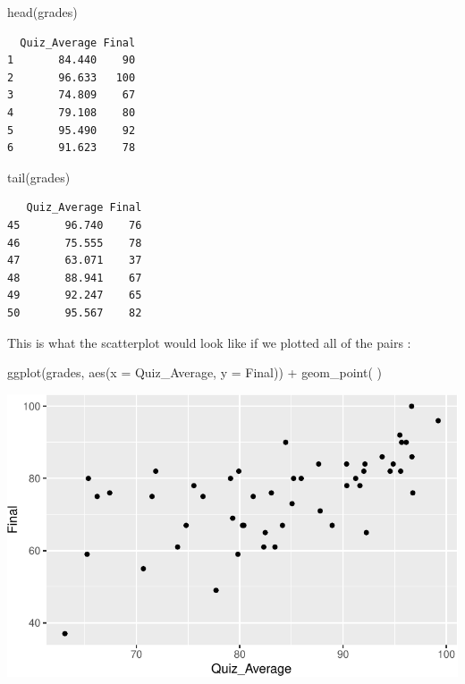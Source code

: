 \documentclass[
  letterpaper,
  DIV=11,
  numbers=noendperiod]{scrreprt}
\newenvironment{Shaded}{\begin{snugshade}}{\end{snugshade}}
\newcommand{\AttributeTok}[1]{\textcolor[rgb]{0.40,0.45,0.13}{#1}}
\newcommand{\FunctionTok}[1]{\textcolor[rgb]{0.28,0.35,0.67}{#1}}
\newcommand{\NormalTok}[1]{\textcolor[rgb]{0.00,0.23,0.31}{#1}}
\newcommand{\SpecialCharTok}[1]{\textcolor[rgb]{0.37,0.37,0.37}{#1}}
\begin{document}
\begin{Shaded}
\begin{Highlighting}[]
\FunctionTok{head}\NormalTok{(grades)}
\end{Highlighting}
\end{Shaded}

\begin{verbatim}
  Quiz_Average Final
1       84.440    90
2       96.633   100
3       74.809    67
4       79.108    80
5       95.490    92
6       91.623    78
\end{verbatim}

\begin{Shaded}
\begin{Highlighting}[]
\FunctionTok{tail}\NormalTok{(grades)}
\end{Highlighting}
\end{Shaded}

\begin{verbatim}
   Quiz_Average Final
45       96.740    76
46       75.555    78
47       63.071    37
48       88.941    67
49       92.247    65
50       95.567    82
\end{verbatim}

This is what the scatterplot would look like if we plotted all of the
pairs :

\begin{Shaded}
\begin{Highlighting}[]
\FunctionTok{ggplot}\NormalTok{(grades, }\FunctionTok{aes}\NormalTok{(}\AttributeTok{x =}\NormalTok{ Quiz\_Average, }\AttributeTok{y =}\NormalTok{ Final)) }\SpecialCharTok{+}
  \FunctionTok{geom\_point}\NormalTok{( )}
\end{Highlighting}
\end{Shaded}

\includegraphics{Scatterplots_and_Correlation_files/figure-pdf/unnamed-chunk-4-1.pdf}
\end{document}
